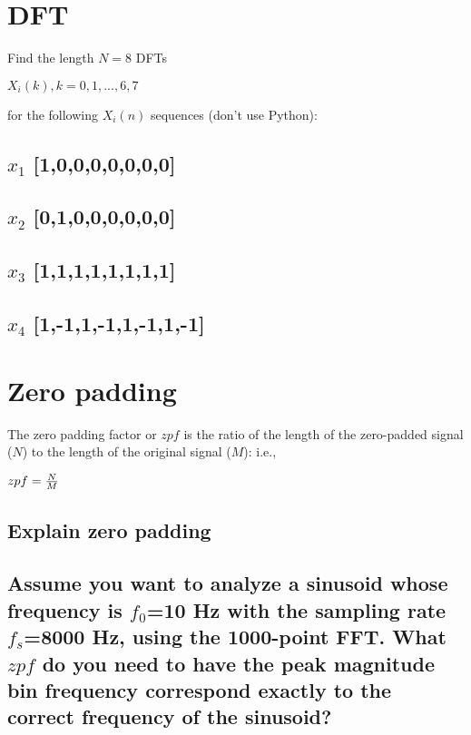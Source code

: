 \documentclass[12pt]{article}%
\begin{document}
\section{DFT}
Find the length $N=8$ DFTs \\ 
\begin{center}
    $X_i (k), k = 0, 1, ..., 6, 7$
\end{center}
for the following $X_i (n)$ sequences (don't use Python):
\subsection{$x_1$ [1,0,0,0,0,0,0,0]}
\subsection{$x_2$ [0,1,0,0,0,0,0,0]}
\subsection{$x_3$ [1,1,1,1,1,1,1,1]}
\subsection{$x_4$ [1,-1,1,-1,1,-1,1,-1]}

\section{Zero padding}
The zero padding factor or $zpf$ is the ratio of the length of the zero-padded signal ($N$) to the length of the original signal ($M$): i.e.,\\
\begin{center}
    $zpf = {N \over M}$
\end{center}
\subsection{Explain zero padding}
\subsection{Assume you want to analyze a sinusoid whose frequency is $f_0$=10  Hz with the sampling rate  $f_s$=8000  Hz, using the 1000-point FFT. What $zpf$ do you need to have the peak magnitude bin frequency correspond exactly to the correct frequency of the sinusoid?}
\end{document}
